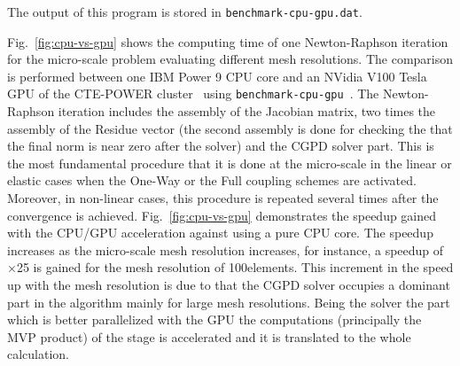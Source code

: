 The output of this program is stored in \texttt{benchmark-cpu-gpu.dat}.

Fig.~\ref{fig:cpu-vs-gpu} shows the computing time of one Newton-Raphson iteration for the micro-scale problem
evaluating different mesh resolutions. The comparison is performed between one IBM Power 9 CPU core and an NVidia V100
Tesla GPU of the CTE-POWER cluster~\cite{cte-power} using \texttt{benchmark-cpu-gpu}~\cite{micropp-doc}. The
Newton-Raphson iteration includes the assembly of the Jacobian matrix, two times the assembly of the Residue vector (the
second assembly is done for checking the that the final norm is near zero after the solver) and the CGPD solver part.
This is the most fundamental procedure that it is done at the micro-scale in the linear or elastic cases when the
One-Way or the Full coupling schemes are activated. Moreover, in non-linear cases, this procedure is repeated several
times after the convergence is achieved. Fig.~\ref{fig:cpu-vs-gpu} demonstrates the speedup gained with the CPU/GPU
acceleration against using a pure CPU core. The speedup increases as the micro-scale mesh resolution increases, for
instance, a speedup of $\times$25 is gained for the mesh resolution of 100\tst elements. This increment in the speed up
with the mesh resolution is due to that the CGPD solver occupies a dominant part in the algorithm mainly for large mesh
resolutions. Being the solver the part which is better parallelized with the GPU the computations (principally the MVP
product) of the stage is accelerated and it is translated to the whole calculation.


